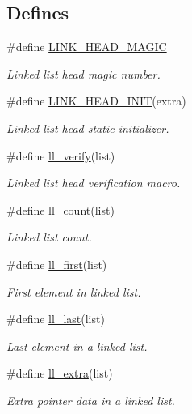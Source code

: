 \subsection*{Defines}
\begin{CompactItemize}
\item 
\#define \hyperlink{group__dbprim__link_ga13}{LINK\_\-HEAD\_\-MAGIC}
\begin{CompactList}\small\item\em Linked list head magic number. \item\end{CompactList}\item 
\#define \hyperlink{group__dbprim__link_ga14}{LINK\_\-HEAD\_\-INIT}(extra)
\begin{CompactList}\small\item\em Linked list head static initializer. \item\end{CompactList}\item 
\#define \hyperlink{group__dbprim__link_ga15}{ll\_\-verify}(list)
\begin{CompactList}\small\item\em Linked list head verification macro. \item\end{CompactList}\item 
\#define \hyperlink{group__dbprim__link_ga16}{ll\_\-count}(list)
\begin{CompactList}\small\item\em Linked list count. \item\end{CompactList}\item 
\#define \hyperlink{group__dbprim__link_ga17}{ll\_\-first}(list)
\begin{CompactList}\small\item\em First element in linked list. \item\end{CompactList}\item 
\#define \hyperlink{group__dbprim__link_ga18}{ll\_\-last}(list)
\begin{CompactList}\small\item\em Last element in a linked list. \item\end{CompactList}\item 
\#define \hyperlink{group__dbprim__link_ga19}{ll\_\-extra}(list)
\begin{CompactList}\small\item\em Extra pointer data in a linked list. \item\end{CompactList}\item 

\end{CompactItemize}
